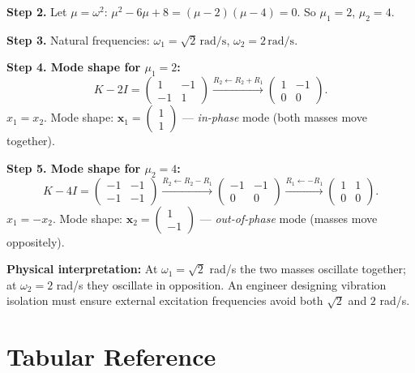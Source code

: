 \documentclass[12pt,a4paper]{article}
\begin{document}
\textbf{Step 2.} Let $\mu = \omega^2$: $\mu^2 - 6\mu + 8 = (\mu-2)(\mu-4) = 0$.
So $\mu_1 = 2$, $\mu_2 = 4$.

\textbf{Step 3.} Natural frequencies: $\omega_1 = \sqrt{2}\,\text{rad/s}$, $\omega_2 = 2\,\text{rad/s}$.

\textbf{Step 4. Mode shape for $\mu_1 = 2$:}
\[
  K - 2I = \begin{pmatrix}1&-1\\-1&1\end{pmatrix}
  \xrightarrow{R_2\leftarrow R_2+R_1}
  \begin{pmatrix}1&-1\\0&0\end{pmatrix}.
\]
$x_1 = x_2$. Mode shape: $\mathbf{x}_1 = \begin{pmatrix}1\\1\end{pmatrix}$ --- \emph{in-phase} mode (both masses move together).

\textbf{Step 5. Mode shape for $\mu_2 = 4$:}
\[
  K - 4I = \begin{pmatrix}-1&-1\\-1&-1\end{pmatrix}
  \xrightarrow{R_2\leftarrow R_2-R_1}
  \begin{pmatrix}-1&-1\\0&0\end{pmatrix}
  \xrightarrow{R_1\leftarrow -R_1}
  \begin{pmatrix}1&1\\0&0\end{pmatrix}.
\]
$x_1 = -x_2$. Mode shape: $\mathbf{x}_2 = \begin{pmatrix}1\\-1\end{pmatrix}$ --- \emph{out-of-phase} mode (masses move oppositely).

\textbf{Physical interpretation:} At $\omega_1=\sqrt{2}$ rad/s the two masses oscillate together; at $\omega_2=2$ rad/s they
oscillate in opposition. An engineer designing vibration isolation must ensure external excitation frequencies
avoid both $\sqrt{2}$ and $2$ rad/s.

\section{Tabular Reference}
\end{document}
